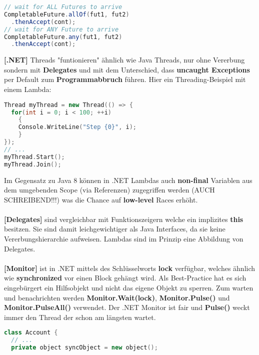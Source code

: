 \documentclass[8pt]{extarticle}
\let\oldtextbf\textbf
\renewcommand{\textbf}{\tiny\oldtextbf}
\begin{document}
\begin{multicols*}{5}
\begin{lstlisting}[language=java]
// wait for ALL Futures to arrive
CompletableFuture.allOf(fut1, fut2)
  .thenAccept(cont);
// wait for ANY Future to arrive
CompletableFuture.any(fut1, fut2)
  .thenAccept(cont);
\end{lstlisting}
\textbf{[.NET]} Threads "funtionieren" ähnlich wie Java Threads, nur ohne Vererbung sondern mit \textbf{Delegates} und mit dem Unterschied, dass \textbf{uncaught Exceptions} per Default zum \textbf{Programmabbruch} führen. Hier ein Threading-Beispiel mit einem Lambda:
\begin{lstlisting}[language=c++]
Thread myThread = new Thread(() => {
  for(int i = 0; i < 100; ++i)
    {
    Console.WriteLine("Step {0}", i);
    }
});
// ...
myThread.Start();
myThread.Join();
\end{lstlisting}
Im Gegensatz zu Java 8 können in .NET Lambdas auch \textbf{non-final} Variablen aus dem umgebenden Scope (via Referenzen) zugegriffen werden (AUCH SCHREIBEND!!!) was die Chance auf \textbf{low-level} Races erhöht.\\\\
\textbf{[Delegates]} sind vergleichbar mit Funktionszeigern welche ein implizites \textbf{this} besitzen. Sie sind damit leichgewichtiger als Java Interfaces, da sie keine Vererbungshierarchie aufweisen. Lambdas sind im Prinzip eine Abbildung von Delegates.\\\\
\textbf{[Monitor]} ist in .NET mittels des Schlüsselworts \textbf{lock} verfügbar, welches ähnlich wie \textbf{synchronized} vor einen Block gehängt wird. Als Best-Practice hat es sich eingebürgert ein Hilfsobjekt und nicht das eigene Objekt zu sperren. Zum warten und benachrichten werden \textbf{Monitor.Wait(lock)}, \textbf{Monitor.Pulse()} und \textbf{Monitor.PulseAll()} verwendet. Der .NET Monitor ist fair und \textbf{Pulse()} weckt immer den Thread der schon am längsten wartet.
\begin{lstlisting}[language=c++]
class Account {
  // ...
  private object syncObject = new object();


\end{lstlisting}
\end{multicols*}
\end{document}
